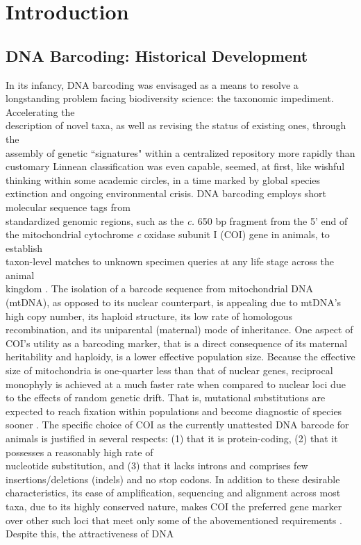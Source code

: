 \section{Introduction}

\subsection{DNA Barcoding: Historical Development}

In its infancy, DNA barcoding \cite{hebert2003biological}  was envisaged as a means to resolve a longstanding problem facing biodiversity science: the taxonomic impediment. Accelerating the \\ description of novel taxa, as well as revising the status of existing ones, through the \\ assembly of genetic ``signatures" within a centralized repository more rapidly than \\ customary Linnean classification was even capable, seemed, at first, like wishful thinking within some academic circles, in a time marked by global species extinction and ongoing environmental crisis. DNA barcoding employs short molecular sequence tags from \\ standardized genomic regions, such as the \textit{c.} 650 bp fragment from the 5' end of the mitochondrial cytochrome \textit{c} oxidase subunit I (COI) gene in animals, to establish \\ taxon-level matches to unknown specimen queries at any life stage across the animal \\ kingdom \cite{hebert2003barcoding}. The isolation of a barcode sequence from mitochondrial DNA (mtDNA), as opposed to its nuclear counterpart, is appealing due to mtDNA's high copy number, its haploid structure, its low rate of homologous recombination, and its uniparental (maternal) mode of inheritance. One aspect of COI's utility as a barcoding marker, that is a direct consequence of its maternal heritability and haploidy, is a lower effective population size. Because the effective size of mitochondria is one-quarter less than that of nuclear genes, reciprocal monophyly is achieved at a much faster rate when compared to nuclear loci due to the effects of random genetic drift. That is, mutational substitutions are expected to reach fixation within populations and become diagnostic of species sooner \cite{hubert2015dna}. The specific choice of COI as the currently unattested DNA barcode for animals is justified in several respects: (1) that it is protein-coding, (2) that it possesses a reasonably high rate of \\ nucleotide substitution, and (3) that it lacks introns and comprises few insertions/deletions (indels) and no stop codons. In addition to these desirable characteristics, its ease of amplification, sequencing and alignment across most taxa, due to its highly conserved nature, makes COI the preferred gene marker over other such loci that meet only some of the abovementioned requirements \cite{phillips2019incomplete}. Despite this, the attractiveness of DNA 
